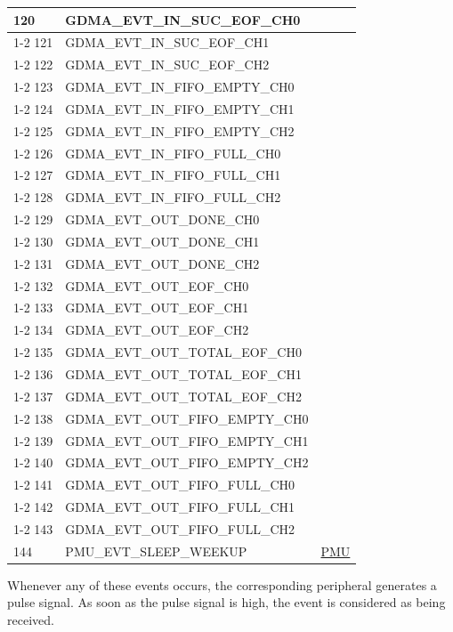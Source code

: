 \documentclass[main\_\_EN.tex]{subfiles}
\begin{document}
\begin{longtable}{ | l | l | l | }
120 & GDMA\_EVT\_IN\_SUC\_EOF\_CH0     & \\ \cline{1-2}
121 & GDMA\_EVT\_IN\_SUC\_EOF\_CH1     & \\ \cline{1-2}
122 & GDMA\_EVT\_IN\_SUC\_EOF\_CH2     & \\ \cline{1-2}
123 & GDMA\_EVT\_IN\_FIFO\_EMPTY\_CH0  & \\ \cline{1-2}
124 & GDMA\_EVT\_IN\_FIFO\_EMPTY\_CH1  & \\ \cline{1-2}
125 & GDMA\_EVT\_IN\_FIFO\_EMPTY\_CH2  & \\ \cline{1-2}
126 & GDMA\_EVT\_IN\_FIFO\_FULL\_CH0   & \\ \cline{1-2}
127 & GDMA\_EVT\_IN\_FIFO\_FULL\_CH1   & \\ \cline{1-2}
128 & GDMA\_EVT\_IN\_FIFO\_FULL\_CH2   & \\ \cline{1-2}
129 & GDMA\_EVT\_OUT\_DONE\_CH0 & \\ \cline{1-2}
130 & GDMA\_EVT\_OUT\_DONE\_CH1 & \\ \cline{1-2}
131 & GDMA\_EVT\_OUT\_DONE\_CH2 & \\ \cline{1-2}
132 & GDMA\_EVT\_OUT\_EOF\_CH0  & \\ \cline{1-2}
133 & GDMA\_EVT\_OUT\_EOF\_CH1  & \\ \cline{1-2}
134 & GDMA\_EVT\_OUT\_EOF\_CH2  & \\ \cline{1-2}
135 & GDMA\_EVT\_OUT\_TOTAL\_EOF\_CH0  & \\ \cline{1-2}
136 & GDMA\_EVT\_OUT\_TOTAL\_EOF\_CH1  & \\ \cline{1-2}
137 & GDMA\_EVT\_OUT\_TOTAL\_EOF\_CH2  & \\ \cline{1-2}
138 & GDMA\_EVT\_OUT\_FIFO\_EMPTY\_CH0 & \\ \cline{1-2}
139 & GDMA\_EVT\_OUT\_FIFO\_EMPTY\_CH1 & \\ \cline{1-2}
140 & GDMA\_EVT\_OUT\_FIFO\_EMPTY\_CH2 & \\ \cline{1-2}
141 & GDMA\_EVT\_OUT\_FIFO\_FULL\_CH0  & \\ \cline{1-2}
142 & GDMA\_EVT\_OUT\_FIFO\_FULL\_CH1  & \\ \cline{1-2}
143 & GDMA\_EVT\_OUT\_FIFO\_FULL\_CH2  & \\ \hline
144 & PMU\_EVT\_SLEEP\_WEEKUP   & \hyperref[mod:lowpowm]{PMU} \\ \hline
\end{longtable}


Whenever any of these events occurs, the corresponding peripheral generates a pulse signal. As soon as the pulse signal is high, the event is considered as being received.
\end{document}
